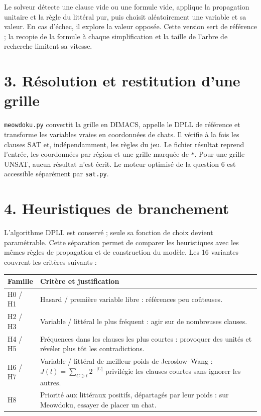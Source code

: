\documentclass[11pt,a4paper]{article}
\begin{document}
Le solveur détecte une clause vide ou une formule vide, applique la
propagation unitaire et la règle du littéral pur, puis choisit aléatoirement
une variable et sa valeur. En cas d'échec, il explore la valeur opposée.
Cette version sert de référence ; la recopie de la formule à chaque
simplification et la taille de l'arbre de recherche limitent sa vitesse.

\section*{3. Résolution et restitution d'une grille}

\texttt{meowdoku.py} convertit la grille en DIMACS, appelle le DPLL de
référence et transforme les variables vraies en coordonnées de chats.
Il vérifie à la fois les clauses SAT et, indépendamment, les règles du jeu.
Le fichier résultat reprend l'entrée, les coordonnées par région et une
grille marquée de \texttt{*}. Pour une grille UNSAT, aucun résultat n'est
écrit. Le moteur optimisé de la question 6 est accessible séparément par
\texttt{sat.py}.

\newpage
\section*{4. Heuristiques de branchement}

L'algorithme DPLL est conservé ; seule sa fonction de choix devient
paramétrable. Cette séparation permet de comparer les heuristiques avec
les mêmes règles de propagation et de construction du modèle.
Les 16 variantes couvrent les critères suivants :

\begin{center}\small
\begin{tabularx}{\linewidth}{lX}
\toprule
Famille & Critère et justification \\
\midrule
H0 / H1 & Hasard / première variable libre : références peu coûteuses. \\
H2 / H3 & Variable / littéral le plus fréquent : agir sur de nombreuses clauses. \\
H4 / H5 & Fréquences dans les clauses les plus courtes : provoquer des unités
et révéler plus tôt les contradictions. \\
H6 / H7 & Variable / littéral de meilleur poids de Jeroslow--Wang :
$J(l)=\sum_{C\ni l}2^{-|C|}$ privilégie les clauses courtes sans ignorer les autres. \\
H8 & Priorité aux littéraux positifs, départagés par leur poids :
sur Meowdoku, essayer de placer un chat. \\
\bottomrule
\end{tabularx}
\end{center}
\end{document}
